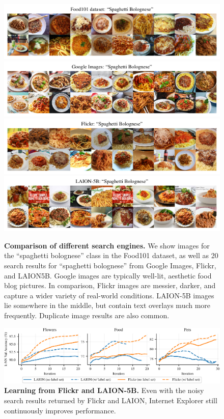 \begin{figure}
    \centering
    \includegraphics{figures/food-spaghetti.pdf} \\
    \includegraphics{figures/google-spaghetti.pdf} \\
    \includegraphics{figures/flickr-spaghetti.pdf} \\
    \includegraphics{figures/laion5b-spaghetti.pdf} 
    \caption{\textbf{Comparison of different search engines.} We show images for the ``spaghetti bolognese'' class in the Food101 dataset, as well as 20 search results for ``spaghetti bolognese'' from Google Images, Flickr, and LAION5B. Google images are typically well-lit, aesthetic food blog pictures. In comparison, Flickr images are messier, darker, and capture a wider variety of real-world conditions. LAION-5B images lie somewhere in the middle, but contain text overlays much more frequently. Duplicate image results are also common.}
    \label{fig:data_comparison}
\end{figure}

\begin{figure}
    \centering
    \includegraphics{figures/laion-curves.pdf}
    \caption{\textbf{Learning from Flickr and LAION-5B.} Even with the noisy search results returned by Flickr and LAION, Internet Explorer still continuously improves performance. }
    \label{fig:other_data_curves}
\end{figure}


